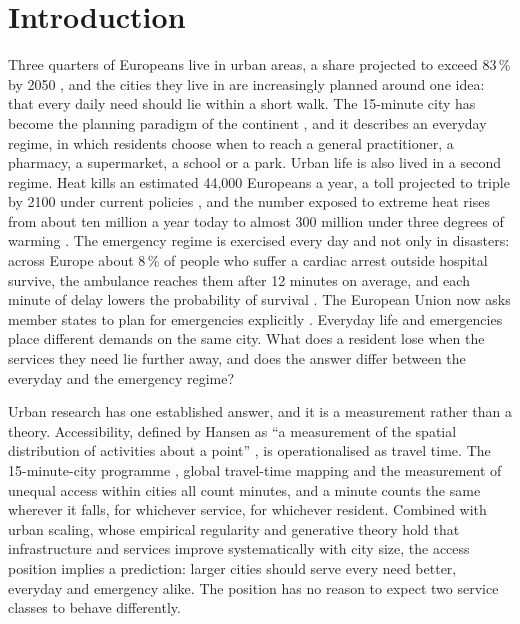 \documentclass[9pt,twocolumn]{article}
\begin{document}
\section*{Introduction}

Three quarters of Europeans live in urban areas, a share projected to
exceed 83\,\% by 2050 \citep{eea2024urbanadaptation}, and the cities they
live in are increasingly planned around one idea: that every daily need
should lie within a short walk. The 15-minute city has become the planning
paradigm of the continent \citep{moreno2021fifteenminute,allam2022fifteenminute},
and it describes an everyday regime, in which residents choose when to
reach a general practitioner, a pharmacy, a supermarket, a school or a
park. Urban life is also lived in a second regime. Heat kills an estimated
44,000 Europeans a year, a toll projected to triple by 2100 under current
policies \citep{garcialeon2024mortality}, and the number exposed to
extreme heat rises from about ten million a year today to almost 300
million under three degrees of warming \citep{naumann2020heat}. The
emergency regime is exercised every day and not only in disasters: across
Europe about 8\,\% of people who suffer a cardiac arrest outside hospital
survive, the ambulance reaches them after 12 minutes on average, and each
minute of delay lowers the probability of survival
\citep{grasner2020eureca,grasner2025eureca3,larsen1993survival}. The
European Union now asks member states to plan for emergencies explicitly
\citep{ec2025preparedness}. Everyday life and emergencies place different
demands on the same city. What does a resident lose when the services they
need lie further away, and does the answer differ between the everyday
and the emergency regime?

Urban research has one established answer, and it is a measurement rather
than a theory. Accessibility, defined by Hansen as ``a measurement of the
spatial distribution of activities about a point''
\citep{hansen1959accessibility}, is operationalised as travel time. The
15-minute-city programme \citep{moreno2021fifteenminute,papadopoulos2023compliance},
global travel-time mapping \citep{weiss2020healthcare,wu2025global} and
the measurement of unequal access within cities
\citep{nicoletti2023disadvantaged} all count minutes, and a minute counts
the same wherever it falls, for whichever service, for whichever
resident. Combined with urban scaling, whose empirical regularity
\citep{bettencourt2007growth} and generative theory
\citep{bettencourt2013origins} hold that infrastructure and services
improve systematically with city size, the access position implies a
prediction: larger cities should serve every need better, everyday and
emergency alike. The position has no reason to expect two service
classes to behave differently.
\end{document}
